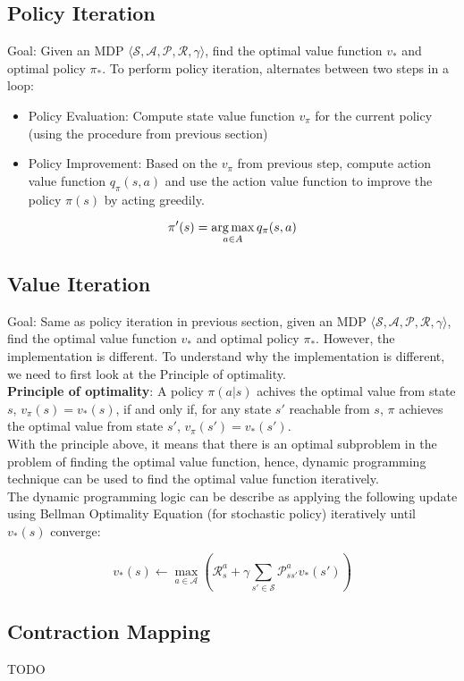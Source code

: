 \subsection{Policy Iteration}

Goal: Given an MDP $\langle \mathcal{S}, \mathcal{A}, \mathcal{P}, \mathcal{R},
    \gamma \rangle$, find the optimal value function $v_*$ and optimal policy
$\pi_*$. To perform policy iteration, alternates between two steps in a loop:

\begin{itemize}
    \item Policy Evaluation: Compute state value function $v_\pi$ for the current policy
          (using the procedure from previous section)
    \item Policy Improvement: Based on the $v_\pi$ from previous step, compute action
          value function $q_\pi(s, a)$ and use the action value function to improve the
          policy $\pi(s)$ by acting greedily.
\end{itemize}

\[
    \pi^\prime(s) = \operatorname*{arg\,max}_{a \in A} q_\pi(s, a)
\]

\subsection{Value Iteration}

Goal: Same as policy iteration in previous section, given an MDP $\langle
    \mathcal{S}, \mathcal{A}, \mathcal{P}, \mathcal{R}, \gamma \rangle$, find the
optimal value function $v_*$ and optimal policy $\pi_*$. However, the
implementation is different. To understand why the implementation is different,
we need to first look at the Principle of optimality. \\

\noindent \textbf{Principle of optimality}: A policy $\pi(a|s)$ achives the
optimal value from state $s$, $v_\pi(s) = v_*(s)$, if and only if, for any
state $s\prime$ reachable from $s$, $\pi$ achieves the optimal value from
state $s\prime$, $v_\pi(s\prime)=v_*(s\prime)$. \\

\noindent With the principle above, it means that there is an optimal subproblem in the
problem of finding the optimal value function, hence, dynamic programming
technique can be used to find the optimal value function iteratively. \\

\noindent The dynamic programming logic can be describe as applying the following update
using Bellman Optimality Equation (for stochastic policy) iteratively until $v_*(s)$
converge:

\[
    v_*(s) \leftarrow \max_{a \in \mathcal{A}} \left( \mathcal{R}_s^a +\gamma \sum_{s\prime \in \mathcal{S}} \mathcal{P}_{ss\prime}^a v_*(s\prime) \right)
\]

\subsection{Contraction Mapping}

TODO
